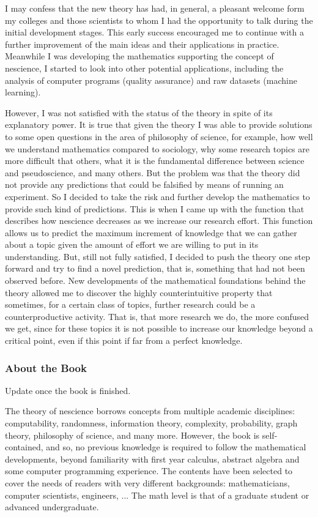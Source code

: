 I may confess that the new theory has had, in general, a pleasant welcome form my colleges and those scientists to whom I had the opportunity to talk during the initial development stages. This early success encouraged me to continue with a further improvement of the main ideas and their applications in practice. Meanwhile I was developing the mathematics supporting the concept of nescience, I started to look into other potential applications, including the analysis of computer programs (quality assurance) and raw datasets (machine learning).

However, I was not satisfied with the status of the theory in spite of its explanatory power. It is true that given the theory I was able to provide solutions to some open questions in the area of philosophy of science, for example, how well we understand mathematics compared to sociology, why some research topics are more difficult that others, what it is the fundamental difference between science and pseudoscience, and many others. But the problem was that the theory did not provide any predictions that could be falsified by means of running an experiment. So I decided to take the risk and further develop the mathematics to provide such kind of predictions. This is when I came up with the function that describes how nescience decreases as we increase our research effort. This function allows us to predict the maximum increment of knowledge that we can gather about a topic given the amount of effort we are willing to put in its understanding. But, still not fully satisfied, I decided to push the theory one step forward and try to find a novel prediction, that is, something that had not been observed before. New developments of the mathematical foundations behind the theory allowed me to discover the highly counterintuitive property that sometimes, for a certain class of topics, further research could be a counterproductive activity. That is, that more research we do, the more confused we get, since for these topics it is not possible to increase our knowledge beyond a critical point, even if this point if far from a perfect knowledge.

%
%

\subsubsection*{About the Book}

{\color{red} Update once the book is finished.}

The theory of nescience borrows concepts from multiple academic disciplines: computability, randomness, information theory, complexity, probability, graph theory, philosophy of science, and many more. However, the book is self-contained, and so, no previous knowledge is required to follow the mathematical developments, beyond familiarity with first year calculus, abstract algebra and some computer programming experience. The contents have been selected to cover the needs of readers with very different backgrounds: mathematicians, computer scientists, engineers, ... The math level is that of a graduate student or advanced undergraduate.

